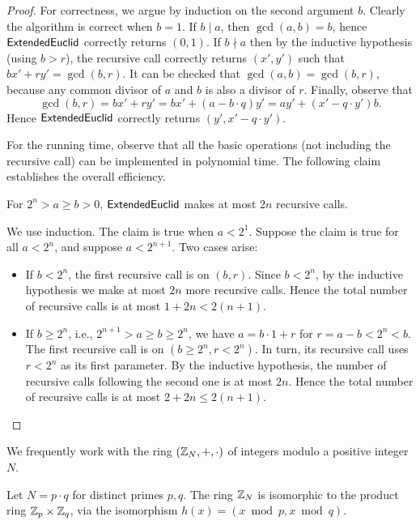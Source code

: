 \documentclass[11pt]{article}
\begin{document}
\begin{proof}
  For correctness, we argue by induction on the second argument $b$.
  Clearly the algorithm is correct when $b=1$.  If $b \mid a$, then
  $\gcd(a,b) = b$, hence $\mathsf{ExtendedEuclid}$ correctly returns $(0,1)$.  If
  $b \nmid a$ then by the inductive hypothesis (using $b > r$), the
  recursive call correctly returns $(x',y')$ such that $bx' + ry' =
  \gcd(b,r)$.  It can be checked that $\gcd(a,b) = \gcd(b,r)$, because
  any common divisor of $a$ and $b$ is also a divisor of $r$.
  Finally, observe that \[ \gcd(b,r) = bx' + ry' = bx' + (a - b \cdot
  q)y' = ay' + (x' - q \cdot y')b. \] Hence $\mathsf{ExtendedEuclid}$ correctly
  returns $(y', x' - q \cdot y')$.
  
  For the running time, observe that all the basic operations (not
  including the recursive call) can be implemented in polynomial
  time.  The following claim establishes the overall efficiency.
  
  \begin{claim}
    For $2^{n} > a \geq b > 0$, $\mathsf{ExtendedEuclid}$ makes at most $2n$
    recursive calls.
  \end{claim}

  We use induction.  The claim is true when $a < 2^{1}$.  Suppose the
  claim is true for all $a < 2^n$, and suppose $a < 2^{n+1}$.  Two
  cases arise:
  \begin{itemize}
  \item If $b < 2^n$, the first recursive call is on $(b, r)$.
    Since $b < 2^n$, by the inductive hypothesis we make at most
    $2n$ more recursive calls.  Hence the total number of recursive
    calls is at most $1 + 2n < 2(n+1)$.
  \item If $b \geq 2^n$, i.e., $2^{n+1} > a \geq b \geq 2^n$, we have
    $a = b \cdot 1 + r$ for $r = a-b < 2^n < b$.  The first recursive
    call is on $(b \geq 2^n, r < 2^n)$.  In turn, its recursive call
    uses $r < 2^n$ as its first parameter.  By the inductive
    hypothesis, the number of recursive calls following the second one
    is at most $2n$.  Hence the total number of recursive calls is at
    most $2 + 2n \leq 2(n+1)$.
  \end{itemize}
\end{proof}

\noindent We frequently work with the ring $(\mathbb{Z}_N, +, \cdot)$ of
integers modulo a positive integer $N$.

\begin{lemma}
  Let $N = p \cdot q$ for distinct primes $p,q$.  The ring $\mathbb{Z}_N$ is
  isomorphic to the product ring $\mathbb{Z}_p \times \mathbb{Z}_q$, via the isomorphism
  $h(x) = (x \bmod p, x \bmod q)$.
\end{lemma}
\end{document}
